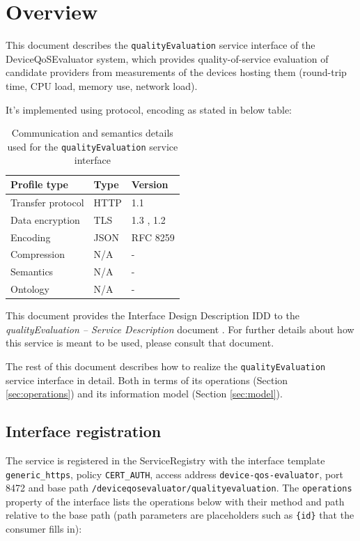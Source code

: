 \documentclass[a4paper]{arrowhead}
\begin{document}
\section{Overview}
\label{sec:overview}

This document describes the \texttt{qualityEvaluation} service interface of the DeviceQoSEvaluator system, which provides quality-of-service evaluation of candidate providers from measurements of the devices hosting them (round-trip time, CPU load, memory use, network load).

It's implemented using protocol, encoding as stated in below table:
\begin{table}[ht!]
  \centering
  \begin{tabular}{|l|l|l|}
    \hline
    \rowcolor{gray!33} Profile type & Type & Version \\ \hline
    Transfer protocol & HTTP & 1.1 \cite{rfc9112} \\ \hline
    Data encryption & TLS & 1.3 \cite{rfc8446}, 1.2 \cite{rfc5246} \\ \hline
    Encoding & JSON & RFC 8259 \cite{rfc8259} \\ \hline
    Compression & N/A & - \\ \hline
    Semantics & N/A & - \\ \hline
    Ontology & N/A & - \\ \hline
  \end{tabular}
  \caption{Communication and semantics details used for the \texttt{qualityEvaluation} service interface}
  \label{tab:comunication_semantics_profile}
\end{table}

This document provides the Interface Design Description IDD to the \textit{qualityEvaluation -- Service Description} document \cite{dqe-qualityEvaluation-sd}.
For further details about how this service is meant to be used, please consult that document.

The rest of this document describes how to realize the \texttt{qualityEvaluation} service
interface in detail. Both in terms of its operations (Section \ref{sec:operations}) and its information model (Section \ref{sec:model}).

\subsection{Interface registration}

The service is registered in the ServiceRegistry with the interface template \texttt{generic\_\allowbreak{}https}, policy \texttt{CERT\_\allowbreak{}AUTH}, access address \texttt{device-\allowbreak{}qos-\allowbreak{}evaluator}, port 8472 and base path \texttt{/\allowbreak{}deviceqosevaluator/\allowbreak{}qualityevaluation}. The \texttt{operations} property of the interface lists the operations below with their method and path relative to the base path (path parameters are placeholders such as \texttt{\{id\}} that the consumer fills in):
\end{document}
